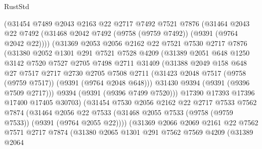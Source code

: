 \begin{lexlean}{RustStd}
\begin{coremodule}
            (@31454
              @7489
              @2043
              @2163
              @22
              @2717
              @7492
              @7521
              @7876
              (@31464
                @2043
                @22
                @7492
                (@31468 @2042 @7492 (@9758 (@9759 @7492)) (@9391 (@9764 @2042 @22))))
              (@31369
                @2053
                @2056
                @2162
                @22
                @7521
                @7530
                @2717
                @7876
                (@31380
                  @2052
                  @1301
                  @291
                  @7521
                  @7528
                  @4209
                  (@31389
                    @2051
                    @648
                    @1250
                    @3142
                    @7520
                    @7527
                    @2705
                    @7498
                    @2711
                    @31409
                    (@31388
                      @2049
                      @158
                      @648
                      @27
                      @7517
                      @2717
                      @2730
                      @2705
                      @7508
                      @2711
                      (@31423 @2048 @7517 (@9758 (@9759 @7517)) (@9391 (@9764 @2048 @648)))
                      @31430
                      @9394
                      (@9391 (@9396 @7509 @2717)))
                    @9394
                    (@9391 (@9396 @7499 @7520)))
                  @17390
                  @17393
                  @17396
                  @17400
                  @17405
                  @30703)
                (@31454
                  @7530
                  @2056
                  @2162
                  @22
                  @2717
                  @7533
                  @7562
                  @7874
                  (@31464
                    @2056
                    @22
                    @7533
                    (@31468 @2055 @7533 (@9758 (@9759 @7533)) (@9391 (@9764 @2055 @22))))
                  (@31369
                    @2066
                    @2069
                    @2161
                    @22
                    @7562
                    @7571
                    @2717
                    @7874
                    (@31380
                      @2065
                      @1301
                      @291
                      @7562
                      @7569
                      @4209
                      (@31389
                        @2064

\end{coremodule}
\end{lexlean}
